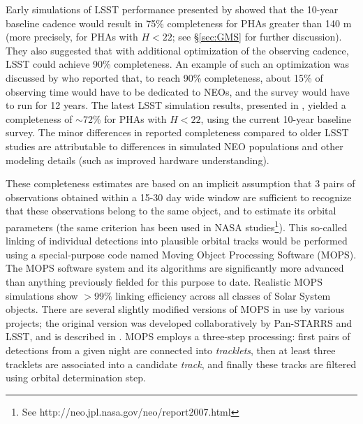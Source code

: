 Early simulations of LSST performance presented by \cite{IvezicNEO2007} showed that the 10-year baseline 
cadence would result in 75\% completeness for PHAs greater than 140 m (more  precisely, for PHAs with 
$H<22$; see \S\ref{sec:GMS} for further discussion). They also suggested that with additional optimization of the 
observing cadence, LSST could achieve 90\% completeness. An example of such an optimization was discussed
by \cite{LSSToverview} who reported that, to reach 90\% completeness, about 15\% of observing time would 
have to be dedicated to NEOs, and the survey would have to run for 12 years.  
The latest LSST simulation results, presented in \cite{JJI2016}, yielded a completeness of $\sim$72\% for
PHAs with $H<22$, using the current 10-year baseline survey. The minor differences in reported completeness
compared to older LSST studies are attributable to differences in simulated NEO populations and other modeling 
details (such as improved hardware understanding). 

These completeness estimates are based on an implicit assumption that 3 pairs of observations
obtained within a 15-30 day wide window are sufficient to recognize that these observations belong 
to the same object, and to estimate its orbital parameters (the same criterion has been used in NASA 
studies\footnote{See http://neo.jpl.nasa.gov/neo/report2007.html}). 
This so-called linking of individual detections into plausible orbital tracks would be performed using a 
special-purpose code named Moving Object Processing Software (MOPS). The MOPS software system and its 
algorithms are significantly more advanced than anything previously fielded for this purpose to date. Realistic 
MOPS simulations show $>$99\% linking efficiency across all classes of Solar System objects. There are several 
slightly modified versions of MOPS in use by various projects; the original version was developed collaboratively 
by Pan-STARRS and LSST, and is described in \cite{denneau13}. MOPS employs a three-step processing: first pairs 
of detections from a given night are connected into {\it tracklets}, then at least three tracklets are associated 
into a candidate {\it track}, and finally these tracks are filtered using orbital determination step. 

